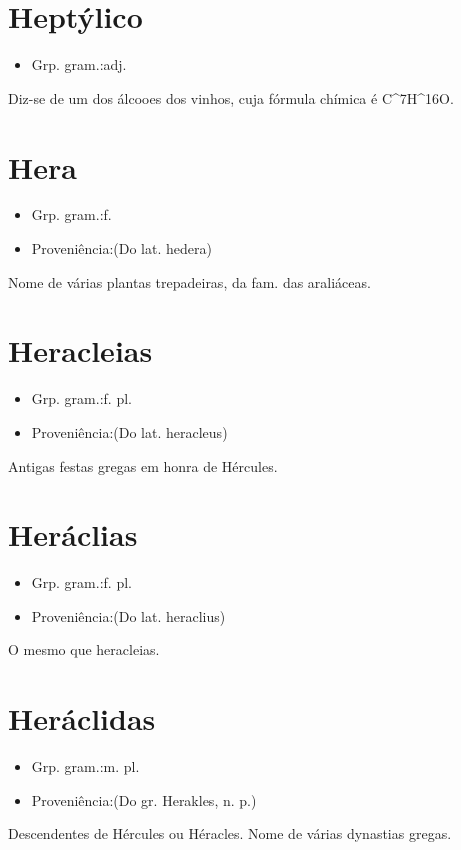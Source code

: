 \documentclass{article}
\begin{document}
\section{Heptýlico}
\begin{itemize}
\item {Grp. gram.:adj.}
\end{itemize}
Diz-se de um dos álcooes dos vinhos, cuja fórmula chímica é C^{7}H^{16}O.
\section{Hera}
\begin{itemize}
\item {Grp. gram.:f.}
\end{itemize}
\begin{itemize}
\item {Proveniência:(Do lat. \textunderscore hedera\textunderscore )}
\end{itemize}
Nome de várias plantas trepadeiras, da fam. das araliáceas.
\section{Heracleias}
\begin{itemize}
\item {Grp. gram.:f. pl.}
\end{itemize}
\begin{itemize}
\item {Proveniência:(Do lat. \textunderscore heracleus\textunderscore )}
\end{itemize}
Antigas festas gregas em honra de Hércules.
\section{Heráclias}
\begin{itemize}
\item {Grp. gram.:f. pl.}
\end{itemize}
\begin{itemize}
\item {Proveniência:(Do lat. \textunderscore heraclius\textunderscore )}
\end{itemize}
O mesmo que \textunderscore heracleias\textunderscore .
\section{Heráclidas}
\begin{itemize}
\item {Grp. gram.:m. pl.}
\end{itemize}
\begin{itemize}
\item {Proveniência:(Do gr. \textunderscore Herakles\textunderscore , n. p.)}
\end{itemize}
Descendentes de Hércules ou Héracles.
Nome de várias dynastias gregas.
\end{document}
